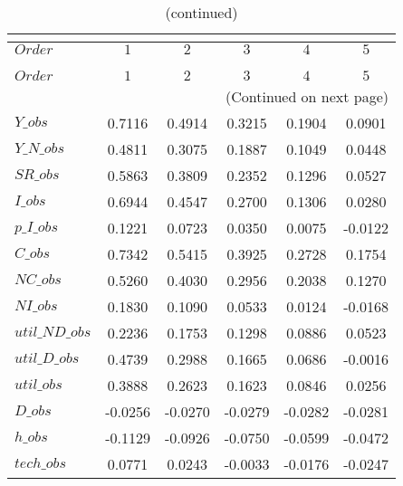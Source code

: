  
\begin{center}
\begin{longtable}{lccccc} 
\caption{COEFFICIENTS OF AUTOCORRELATION}\\
 \label{Table:th_autocorr_matrix}\\
\toprule 
$Order          $	 & 	 $          1$	 & 	 $          2$	 & 	 $          3$	 & 	 $          4$	 & 	 $          5$\\
\midrule \endfirsthead 
\caption{(continued)}\\
 \toprule \\ 
$Order          $	 & 	 $          1$	 & 	 $          2$	 & 	 $          3$	 & 	 $          4$	 & 	 $          5$\\
\midrule \endhead 
\midrule \multicolumn{6}{r}{(Continued on next page)} \\ \bottomrule \endfoot 
\bottomrule \endlastfoot 
$Y\_obs         $	 & 	     0.7116	 & 	     0.4914	 & 	     0.3215	 & 	     0.1904	 & 	     0.0901 \\ 
$Y\_N\_obs      $	 & 	     0.4811	 & 	     0.3075	 & 	     0.1887	 & 	     0.1049	 & 	     0.0448 \\ 
$SR\_obs        $	 & 	     0.5863	 & 	     0.3809	 & 	     0.2352	 & 	     0.1296	 & 	     0.0527 \\ 
$I\_obs         $	 & 	     0.6944	 & 	     0.4547	 & 	     0.2700	 & 	     0.1306	 & 	     0.0280 \\ 
$p\_I\_obs      $	 & 	     0.1221	 & 	     0.0723	 & 	     0.0350	 & 	     0.0075	 & 	    -0.0122 \\ 
$C\_obs         $	 & 	     0.7342	 & 	     0.5415	 & 	     0.3925	 & 	     0.2728	 & 	     0.1754 \\ 
$NC\_obs        $	 & 	     0.5260	 & 	     0.4030	 & 	     0.2956	 & 	     0.2038	 & 	     0.1270 \\ 
$NI\_obs        $	 & 	     0.1830	 & 	     0.1090	 & 	     0.0533	 & 	     0.0124	 & 	    -0.0168 \\ 
$util\_ND\_obs  $	 & 	     0.2236	 & 	     0.1753	 & 	     0.1298	 & 	     0.0886	 & 	     0.0523 \\ 
$util\_D\_obs   $	 & 	     0.4739	 & 	     0.2988	 & 	     0.1665	 & 	     0.0686	 & 	    -0.0016 \\ 
$util\_obs      $	 & 	     0.3888	 & 	     0.2623	 & 	     0.1623	 & 	     0.0846	 & 	     0.0256 \\ 
$D\_obs         $	 & 	    -0.0256	 & 	    -0.0270	 & 	    -0.0279	 & 	    -0.0282	 & 	    -0.0281 \\ 
$h\_obs         $	 & 	    -0.1129	 & 	    -0.0926	 & 	    -0.0750	 & 	    -0.0599	 & 	    -0.0472 \\ 
$tech\_obs      $	 & 	     0.0771	 & 	     0.0243	 & 	    -0.0033	 & 	    -0.0176	 & 	    -0.0247 \\ 
\end{longtable}
 \end{center}

